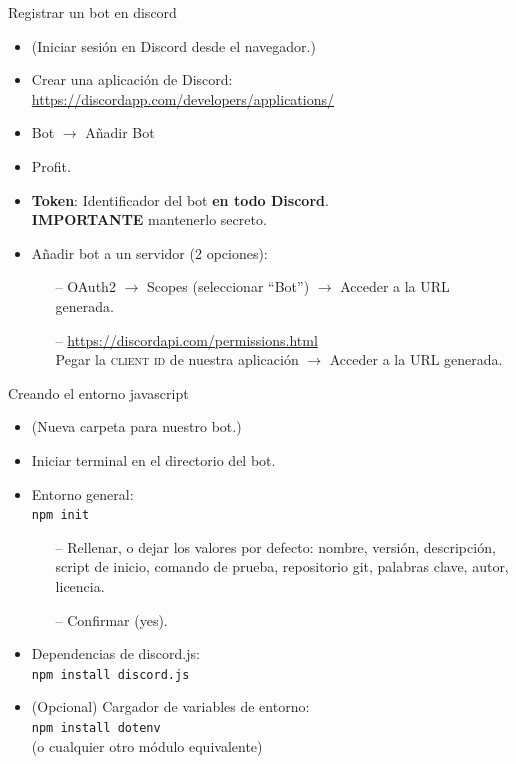 \documentclass[10pt]{beamer} %
\begin{document}
\begin{frame}{Registrar un bot en discord}
    \begin{itemize}
        \item (Iniciar sesión en Discord desde el navegador.)
        \item Crear una aplicación de Discord: \\ \url{https://discordapp.com/developers/applications/}
        \item Bot $\rightarrow$ Añadir Bot
        \item Profit.
        \item \textbf{Token}: Identificador del bot \textbf{en todo Discord}. \\ \textbf{IMPORTANTE} mantenerlo secreto. \vspace{.4cm}
        \item Añadir bot a un servidor (2 opciones): \\
        \begin{itemize}
            \item[--] OAuth2 $\rightarrow$ Scopes (seleccionar ``Bot'') $\rightarrow$ Acceder a la URL generada.
            \item[--] \url{https://discordapi.com/permissions.html} \\ Pegar la \textsc{client id} de nuestra aplicación $ \rightarrow $ Acceder a la URL generada.
        \end{itemize}
    \end{itemize}
\end{frame}

\begin{frame}{Creando el entorno javascript}
    \begin{itemize}
        \item (Nueva carpeta para nuestro bot.)
        \item Iniciar terminal en el directorio del bot.
        \item Entorno general: \\ \texttt{npm init}
            \begin{itemize}
                \item[--] Rellenar, o dejar los valores por defecto: nombre, versión, descripción, script de inicio, comando de prueba, repositorio git, palabras clave, autor, licencia.
                \item[--] Confirmar (yes).
            \end{itemize}
        \item Dependencias de discord.js: \\ \texttt{npm install discord.js}
        \item (Opcional) Cargador de variables de entorno: \\ \texttt{npm install dotenv} \\ (o cualquier otro módulo equivalente)
    \end{itemize}
\end{frame}
\end{document}
